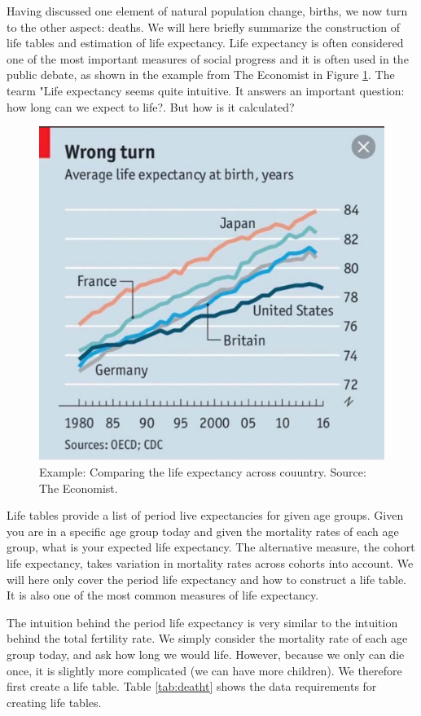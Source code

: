 \documentclass[]{book}
\begin{document}
Having discussed one element of natural population change, births, we now turn to the other aspect: deaths. We will here briefly summarize the construction of life tables and estimation of life expectancy. Life expectancy is often considered one of the most important measures of social progress and it is often used in the public debate, as shown in the example from The Economist in Figure \ref{fig:life}. The tearm "Life expectancy seems quite intuitive. It answers an important question: how long can we expect to life?. But how is it calculated?

\begin{figure}

{\centering \includegraphics[width=0.5\linewidth]{_resources/chapter_death/economist} 

}

\caption{Example: Comparing the life expectancy across couuntry. Source: The Economist.}\label{fig:life}
\end{figure}

Life tables provide a list of period live expectancies for given age groups. Given you are in a specific age group today and given the mortality rates of each age group, what is your expected life expectancy. The alternative measure, the cohort life expectancy, takes variation in mortality rates across cohorts into account. We will here only cover the period life expectancy and how to construct a life table. It is also one of the most common measures of life expectancy.

The intuition behind the period life expectancy is very similar to the intuition behind the total fertility rate. We simply consider the mortality rate of each age group today, and ask how long we would life. However, because we only can die once, it is slightly more complicated (we can have more children). We therefore first create a life table. Table \ref{tab:deatht} shows the data requirements for creating life tables.
\end{document}
